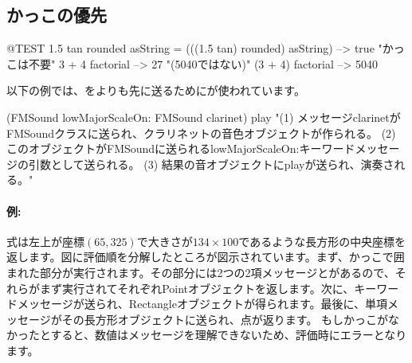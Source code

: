 \documentclass[a4paper,10pt,twoside]{book}
\begin{document}
\subsection{かっこの優先}


\begin{code}{@TEST}
1.5 tan rounded asString = (((1.5 tan) rounded) asString) --> true    "かっこは不要"
3 + 4 factorial   --> 27    "(5040ではない)"
(3 + 4) factorial --> 5040
\end{code}

以下の例では、をよりも先に送るためにが使われています。
\begin{code}{}
(FMSound lowMajorScaleOn: FMSound clarinet) play 
"(1) メッセージclarinetがFMSoundクラスに送られ、クラリネットの音色オブジェクトが作られる。
 (2) このオブジェクトがFMSoundに送られるlowMajorScaleOn:キーワードメッセージの引数として送られる。
 (3) 結果の音オブジェクトにplayが送られ、演奏される。"
\end{code}



\paragraph{例:}
式は左上が座標$(65, 325)$で大きさが$134{\times}100$であるような長方形の中央座標を返します。図に評価順を分解したところが図示されています。まず、かっこで囲まれた部分が実行されます。その部分には2つの2項メッセージとがあるので、それらがまず実行されてそれぞれPointオブジェクトを返します。次に、キーワードメッセージが送られ、Rectangleオブジェクトが得られます。最後に、単項メッセージがその長方形オブジェクトに送られ、点が返ります。
もしかっこがなかったとすると、数値はメッセージを理解できないため、評価時にエラーとなります。
\end{document}
